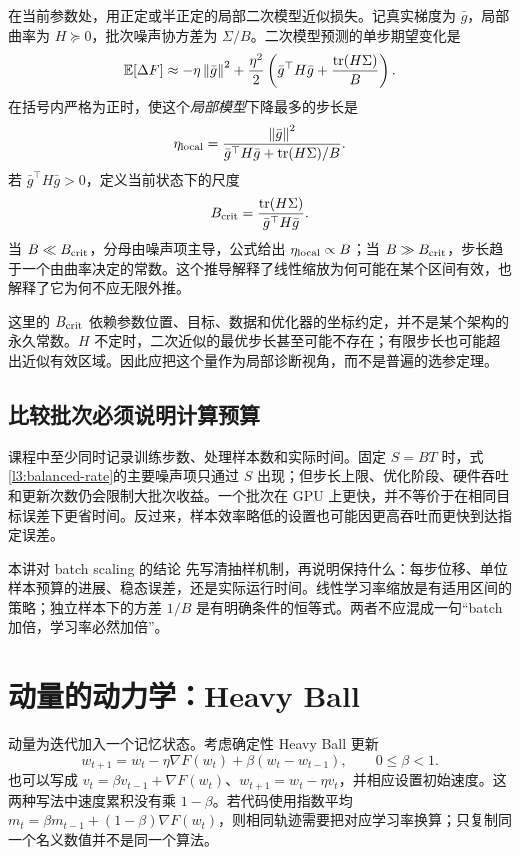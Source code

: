 在当前参数处，用正定或半正定的局部二次模型近似损失。记真实梯度为 $\bar g$，局部曲率为 $H\succeq0$，批次噪声协方差为 $\Sigma/B$。二次模型预测的单步期望变化是
\begin{equation}
 \mathbb E[\Delta F]\approx
 -\eta\left\lVert\bar g\right\rVert^2+
 \frac{\eta^2}{2}
 \left(\bar g^\top H\bar g+\frac{\operatorname{tr}(H\Sigma)}{B}\right).
 \label{l3:local-batch-model}
\end{equation}
在括号内严格为正时，使这个\emph{局部模型}下降最多的步长是
\begin{equation}
 \eta_{\rm local}=
 \frac{\left\lVert\bar g\right\rVert^2}{\bar g^\top H\bar g+\operatorname{tr}(H\Sigma)/B}.
 \label{l3:local-optimal-step}
\end{equation}
若 $\bar g^\top H\bar g>0$，定义当前状态下的尺度
\[
 B_{\rm crit}=\frac{\operatorname{tr}(H\Sigma)}{\bar g^\top H\bar g}.
\]
当 $B\ll B_{\rm crit}$，分母由噪声项主导，公式给出 $\eta_{\rm local}\propto B$；当 $B\gg B_{\rm crit}$，步长趋于一个由曲率决定的常数。这个推导解释了线性缩放为何可能在某个区间有效，也解释了它为何不应无限外推。

这里的 $B_{\rm crit}$ 依赖参数位置、目标、数据和优化器的坐标约定，并不是某个架构的永久常数。$H$ 不定时，二次近似的最优步长甚至可能不存在；有限步长也可能超出近似有效区域。因此应把这个量作为局部诊断视角，而不是普遍的选参定理。

\subsection{比较批次必须说明计算预算}

课程中至少同时记录训练步数、处理样本数和实际时间。固定 $S=BT$ 时，式\eqref{l3:balanced-rate}的主要噪声项只通过 $S$ 出现；但步长上限、优化阶段、硬件吞吐和更新次数仍会限制大批次收益。一个批次在 GPU 上更快，并不等价于在相同目标误差下更省时间。反过来，样本效率略低的设置也可能因更高吞吐而更快到达指定误差。

\begin{coursebox}{本讲对 batch scaling 的结论}
先写清抽样机制，再说明保持什么：每步位移、单位样本预算的进展、稳态误差，还是实际运行时间。线性学习率缩放是有适用区间的策略；独立样本下的方差 $1/B$ 是有明确条件的恒等式。两者不应混成一句“batch 加倍，学习率必然加倍”。
\end{coursebox}

\section{动量的动力学：Heavy Ball}
\label{l3:heavy-ball}

动量为迭代加入一个记忆状态。考虑确定性 Heavy Ball 更新
\begin{equation}
 w_{t+1}=w_t-\eta\nabla F(w_t)+\beta(w_t-w_{t-1}),
 \qquad 0\leq\beta<1.
 \label{l3:hb}
\end{equation}
也可以写成 $v_t=\beta v_{t-1}+\nabla F(w_t)$、$w_{t+1}=w_t-\eta v_t$，并相应设置初始速度。这两种写法中速度累积没有乘 $1-\beta$。若代码使用指数平均
$m_t=\beta m_{t-1}+(1-\beta)\nabla F(w_t)$，则相同轨迹需要把对应学习率换算；只复制同一个名义数值并不是同一个算法。

